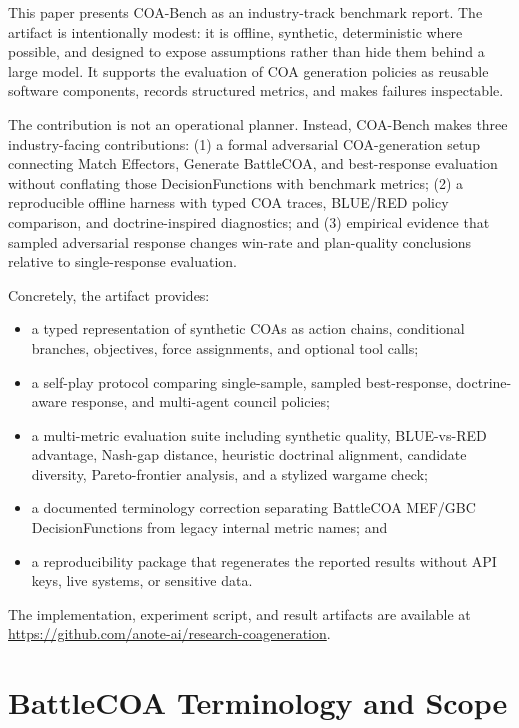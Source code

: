 \documentclass[sigconf]{acmart}
\begin{document}
This paper presents COA-Bench as an industry-track benchmark report. The artifact is intentionally modest: it is offline, synthetic, deterministic where possible, and designed to expose assumptions rather than hide them behind a large model. It supports the evaluation of COA generation policies as reusable software components, records structured metrics, and makes failures inspectable.

The contribution is not an operational planner. Instead, COA-Bench makes three industry-facing contributions: (1) a formal adversarial COA-generation setup connecting Match Effectors, Generate BattleCOA, and best-response evaluation without conflating those DecisionFunctions with benchmark metrics; (2) a reproducible offline harness with typed COA traces, BLUE/RED policy comparison, and doctrine-inspired diagnostics; and (3) empirical evidence that sampled adversarial response changes win-rate and plan-quality conclusions relative to single-response evaluation.

Concretely, the artifact provides:

\begin{itemize}
  \item a typed representation of synthetic COAs as action chains, conditional branches, objectives, force assignments, and optional tool calls;
  \item a self-play protocol comparing single-sample, sampled best-response, doctrine-aware response, and multi-agent council policies;
  \item a multi-metric evaluation suite including synthetic quality, BLUE-vs-RED advantage, Nash-gap distance, heuristic doctrinal alignment, candidate diversity, Pareto-frontier analysis, and a stylized wargame check;
  \item a documented terminology correction separating BattleCOA MEF/GBC DecisionFunctions from legacy internal metric names; and
  \item a reproducibility package that regenerates the reported results without API keys, live systems, or sensitive data.
\end{itemize}

The implementation, experiment script, and result artifacts are available at \url{https://github.com/anote-ai/research-coageneration}.

\section{BattleCOA Terminology and Scope}
\end{document}
